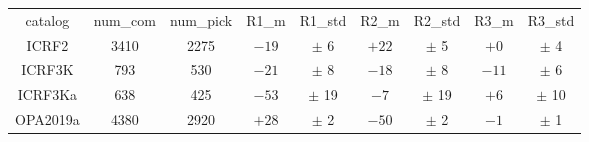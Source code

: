 \begin{table}
\begin{tabular}{ccccccccc}
catalog & num_com & num_pick & R1_m & R1_std & R2_m & R2_std & R3_m & R3_std \\
ICRF2 & 3410 & 2275 & $ -19$ & $\pm$  6 & $ +22$ & $\pm$  5 & $  +0$ & $\pm$  4 \\
ICRF3K & 793 & 530 & $ -21$ & $\pm$  8 & $ -18$ & $\pm$  8 & $ -11$ & $\pm$  6 \\
ICRF3Ka & 638 & 425 & $ -53$ & $\pm$ 19 & $  -7$ & $\pm$ 19 & $  +6$ & $\pm$ 10 \\
OPA2019a & 4380 & 2920 & $ +28$ & $\pm$  2 & $ -50$ & $\pm$  2 & $  -1$ & $\pm$  1 \\
\end{tabular}
\end{table}
